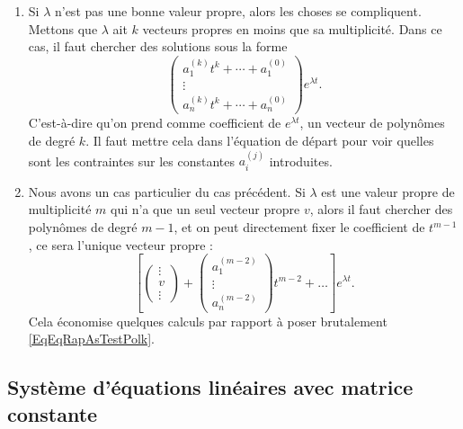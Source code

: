 \begin{enumerate}
	\item
	      Si \( \lambda\) n'est pas une bonne valeur propre, alors les choses se compliquent. Mettons que \( \lambda\) ait \( k\) vecteurs propres en moins que sa multiplicité. Dans ce cas, il faut chercher des solutions sous la forme
	      \begin{equation}		\label{EqEqRapAsTestPolk}
		      \begin{pmatrix}
			      a^{(k)}_1t^k+\cdots+a_1^{(0)} \\
			      \vdots                        \\
			      a^{(k)}_nt^k+\cdots+a_n^{(0)}
		      \end{pmatrix} e^{\lambda t}.
	      \end{equation}
	      C'est-à-dire qu'on prend comme coefficient de \(  e^{\lambda t}\), un vecteur de polynômes de degré \( k\). Il faut mettre cela dans l'équation de départ pour voir quelles sont les contraintes sur les constantes \( a_i^{(j)}\) introduites.

	      \item\label{ItemRapSystDe}
	      Nous avons un cas particulier du cas précédent. Si \( \lambda\) est une valeur propre de multiplicité \( m\) qui n'a que un seul vecteur propre \( v\), alors il faut chercher des polynômes de degré \( m-1\), et on peut directement fixer le coefficient de \( t^{m-1}\), ce sera l'unique vecteur propre :
	      \begin{equation}
		      \left[
		      \begin{pmatrix}
			      \vdots \\
			      v      \\
			      \vdots
		      \end{pmatrix}+
		      \begin{pmatrix}
			      a_1^{(m-2)} \\
			      \vdots      \\
			      a_n^{(m-2)}
		      \end{pmatrix}t^{m-2}+\ldots
		      \right] e^{\lambda t}.
	      \end{equation}
	      Cela économise quelques calculs par rapport à poser brutalement \eqref{EqEqRapAsTestPolk}.

\end{enumerate}
\let\theenumi\oldTheEnumi

\subsection{Système d'équations linéaires avec matrice constante}

